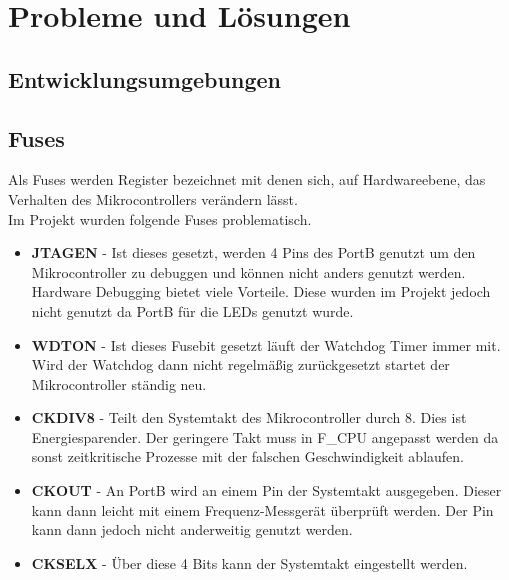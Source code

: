 \chapter{Probleme und Lösungen}
\section{Entwicklungsumgebungen}
\section{Fuses}
\label{sec:Fuses}
Als Fuses werden Register bezeichnet mit denen sich, auf Hardwareebene, das Verhalten des Mikrocontrollers verändern lässt. \\
Im Projekt wurden folgende Fuses problematisch.
\begin{itemize}
\item \textbf{JTAGEN} - Ist dieses  gesetzt, werden 4 Pins des PortB genutzt um den Mikrocontroller zu debuggen und können nicht anders genutzt werden. Hardware Debugging bietet viele Vorteile. Diese wurden im Projekt jedoch nicht genutzt da PortB für die LEDs genutzt wurde.
\item \textbf{WDTON} - Ist dieses Fusebit gesetzt läuft der Watchdog Timer immer mit. Wird der Watchdog dann nicht regelmäßig zurückgesetzt startet der Mikrocontroller ständig neu.
\item \textbf{CKDIV8} - Teilt den Systemtakt des Mikrocontroller durch 8. Dies ist Energiesparender. Der geringere Takt muss in F\_CPU angepasst werden da sonst zeitkritische Prozesse mit der falschen Geschwindigkeit ablaufen.
\item \textbf{CKOUT} - An PortB wird an einem Pin der Systemtakt ausgegeben. Dieser kann dann leicht mit einem Frequenz-Messgerät überprüft werden. Der Pin kann dann jedoch nicht anderweitig genutzt werden.
\item \textbf{CKSELX} - Über diese 4 Bits kann der Systemtakt eingestellt werden.
\end{itemize}
